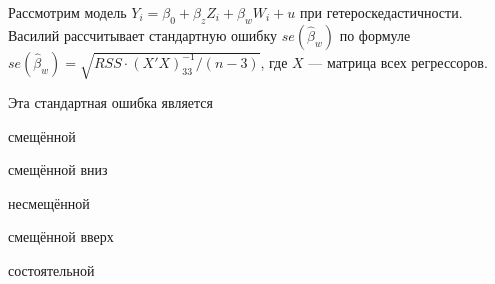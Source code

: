 
\begin{question}
Рассмотрим модель \(Y_i= \beta_0 + \beta_z Z_{i} + \beta_w W_{i} + u\) при гетероскедастичности.
Василий рассчитывает стандартную ошибку \(se(\hat\beta_w)\) по формуле \(se(\hat\beta_w)=\sqrt{RSS \cdot (X'X)^{-1}_{33}/(n-3)}\),
где \(X\) --- матрица всех регрессоров.

Эта стандартная ошибка является
\begin{answerlist}
  \item смещённой
  \item смещённой вниз
  \item несмещённой
  \item смещённой вверх
  \item состоятельной
\end{answerlist}
\end{question}


